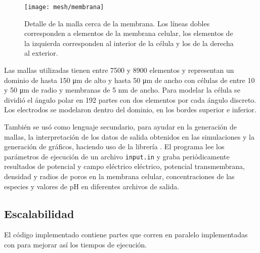 \begin{figure}
	\texttt{[image: mesh/membrana]}
	\caption{Detalle de la malla cerca de la membrana. Los líneas dobles corresponden a elementos de la membrana celular, los elementos de la izquierda corresponden al interior de la célula y los de la derecha al exterior.}
	\label{fig:mesh-membrana}
\end{figure}


Las mallas utilizadas tienen entre 7500 y 8900 elementos y representan un dominio de hasta 150 \si{\micro\metre} de alto y hasta 50 \si{\micro\metre} de ancho con células de entre 10 y 50 \si{\micro\metre} de radio y membranas de 5 \si{\nano\metre} de ancho. Para modelar la célula se dividió el ángulo polar en 192 partes con dos elementos por cada ángulo discreto. Los electrodos se modelaron dentro del dominio, en los bordes superior e inferior.

También se usó  como lenguaje secundario, para ayudar en la generación de mallas, la interpretación de los datos de salida obtenidos en las simulaciones y la generación de gráficos, haciendo uso de la librería  \cite{matplotlib}. El programa lee los parámetros de ejecución de un archivo \texttt{input.in} y graba periódicamente resultados de potencial y campo eléctrico eléctrico, potencial transmembrana, densidad y radios de poros en la membrana celular, concentraciones de las especies y valores de pH en diferentes archivos de salida.


\subsection*{Escalabilidad}

El código implementado contiene partes que corren en paralelo implementadas con  para mejorar así los tiempos de ejecución.\\

